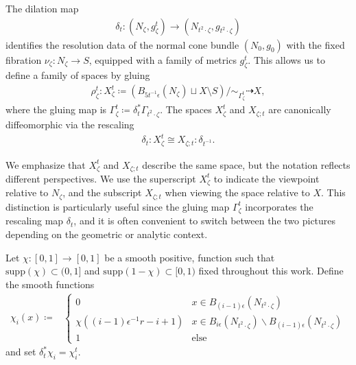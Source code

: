 \documentclass[psamsfonts]{amsart}
\theoremstyle{plain}
\theoremstyle{definition}{
\newtheorem{defi}{Definition}[section]
\newtheorem{ass}{Assumption}
\newtheorem*{nota}{Notation}}
\theoremstyle{remark}{
\newtheorem{rem}{Remark}
\newtheorem{ex}{Example}}
\theoremstyle{plain}{
\newtheorem{thm}{Theorem}[section]
\newtheorem{lem}{Lemma}[section]
\newtheorem{cor}{Corollary}[section]
\newtheorem{prop}{Proposition}[section]
\newtheorem{con}{Conjecture}[section]}
\newcommand{\m}[1]{{\mathrm{#1}}}
\begin{document}
\begin{rem}
The dilation map
\begin{align*}
    \delta_t \colon (N_\zeta, g^t_\zeta) \rightarrow (N_{t^2 \cdot \zeta}, g_{t^2 \cdot \zeta})
\end{align*}
identifies the resolution data of the normal cone bundle $(N_0, g_0)$ with the fixed fibration $\nu_\zeta \colon N_\zeta \to S$, equipped with a family of metrics $g^t_\zeta$. This allows us to define a family of spaces by gluing
\begin{align*}
    \rho^{t}_\zeta \colon X^t_{\zeta} \coloneqq \left( B_{5t^{-1}\epsilon}(N_\zeta) \sqcup X \setminus S \right) / \sim_{\Gamma^t_\zeta} \dashrightarrow X,
\end{align*}
where the gluing map is $\Gamma^t_\zeta \coloneqq \delta_t^* \Gamma_{t^2 \cdot \zeta}$. The spaces $X^t_{\zeta}$ and $X_{\zeta;t}$ are canonically diffeomorphic via the rescaling
\begin{align*}
    \delta_t \colon X^t_{\zeta} \cong X_{\zeta;t} \colon \delta_{t^{-1}}.
\end{align*}

We emphasize that $X^t_{\zeta}$ and $X_{\zeta;t}$ describe the same space, but the notation reflects different perspectives. We use the superscript $X^t_{\zeta}$ to indicate the viewpoint relative to $N_\zeta$, and the subscript $X_{\zeta;t}$ when viewing the space relative to $X$. This distinction is particularly useful since the gluing map $\Gamma^t_\zeta$ incorporates the rescaling map $\delta_t$, and it is often convenient to switch between the two pictures depending on the geometric or analytic context.

\end{rem}




Let ${\chi}\colon [0,1]\rightarrow[0,1]$ be a smooth positive, function such that $\m{supp}({\chi})\subset(0,1]$ and $\m{supp}(1-{\chi})\subset[0,1)$ fixed throughout this work. Define the smooth functions
\begin{align*}
    {\chi_i}(x)\coloneqq&\left\{\begin{array}{cl}
     0&x\in B_{(i-1)\epsilon}(N_{t^2\cdot\zeta})\\
     {\chi}((i-1)\epsilon^{-1}r-i+1)&x\in B_{i\epsilon}(N_{t^2\cdot\zeta})\backslash B_{(i-1)\epsilon}(N_{t^2\cdot\zeta}) \\
     1& \text{else} 
    \end{array}\right.
\end{align*}
and set $\delta^*_t\chi_i=\chi^t_i$.
\end{document}
